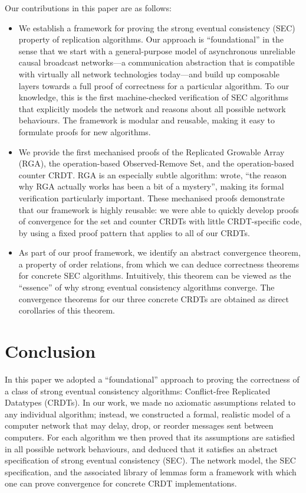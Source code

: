 \documentclass[acmlarge,review]{acmart}
\begin{document}
Our contributions in this paper are as follows:
\begin{itemize}
\item
We establish a framework for proving the strong eventual consistency (SEC) property of replication algorithms.
Our approach is ``foundational'' in the sense that we start with a general-purpose model of asynchronous unreliable causal broadcast networks---a communication abstraction that is compatible with virtually all network technologies today---and build up composable layers towards a full proof of correctness for a particular algorithm.
To our knowledge, this is the first machine-checked verification of SEC algorithms that explicitly models the network and reasons about all possible network behaviours.
The framework is modular and reusable, making it easy to formulate proofs for new algorithms.
\item
We provide the first mechanised proofs of the Replicated Growable Array (RGA), the operation-based Observed-Remove Set, and the operation-based counter CRDT.
RGA is an especially subtle algorithm: \citet{Attiya:2016kh} wrote, ``the reason why RGA actually works has been a bit of a mystery'', making its formal verification particularly important.
These mechanised proofs demonstrate that our framework is highly reusable: we were able to quickly develop proofs of convergence for the set and counter CRDTs with little CRDT-specific code, by using a fixed proof pattern that applies to all of our CRDTs.
\item
As part of our proof framework, we identify an abstract convergence theorem, a property of order relations, from which we can deduce correctness theorems for concrete SEC algorithms.
Intuitively, this theorem can be viewed as the ``essence'' of why strong eventual consistency algorithms converge.
The convergence theorems for our three concrete CRDTs are obtained as direct corollaries of this theorem.
\end{itemize}









\section{Conclusion}
\label{sect.conclusion}

In this paper we adopted a ``foundational'' approach to proving the correctness of a class of strong eventual consistency algorithms: Conflict-free Replicated Datatypes (CRDTs).
In our work, we made no axiomatic assumptions related to any individual algorithm; instead, we constructed a formal, realistic model of a computer network that may delay, drop, or reorder messages sent between computers.
For each algorithm we then proved that its assumptions are satisfied in all possible network behaviours, and deduced that it satisfies an abstract specification of strong eventual consistency (SEC).
The network model, the SEC specification, and the associated library of lemmas form a framework with which one can prove convergence for concrete CRDT implementations.
\end{document}
